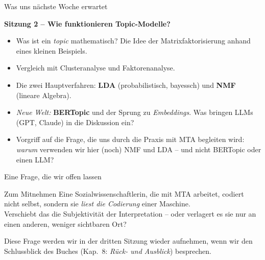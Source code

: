 \documentclass[aspectratio=169,11pt]{beamer}
\let\oldemph\emph
\renewcommand{\emph}[1]{{\color{solCyan}\oldemph{#1}}}
\let\oldtextbf\textbf
\renewcommand{\textbf}[1]{{\color{solBase3}\oldtextbf{#1}}}
\begin{document}
\begin{frame}{Was uns nächste Woche erwartet}

  \textbf{Sitzung 2 – Wie funktionieren Topic-Modelle?}

  \vfill
  \begin{itemize}
    \item Was ist ein \emph{topic} mathematisch? Die Idee der
          Matrixfaktorisierung anhand eines kleinen Beispiels.
    \vfill
    \item Vergleich mit Clusteranalyse und Faktorenanalyse.
    \vfill
    \item Die zwei Hauptverfahren: \textbf{LDA} (probabilistisch,
          bayessch) und \textbf{NMF} (lineare Algebra).
    \vfill
    \item \emph{Neue Welt:} \textbf{BERTopic} und der Sprung zu
          \emph{Embeddings}. Was bringen LLMs (GPT, Claude) in die
          Diskussion ein?
    \vfill
    \item Vorgriff auf die Frage, die uns durch die Praxis mit MTA
          begleiten wird: \emph{warum} verwenden wir hier (noch)
          NMF und LDA – und nicht BERTopic oder einen LLM?
  \end{itemize}

\end{frame}

\begin{frame}{Eine Frage, die wir offen lassen}

  \begin{block}{Zum Mitnehmen}
    Eine Sozialwissenschaftlerin, die mit MTA arbeitet, codiert nicht
    selbst, sondern sie \emph{liest die Codierung} einer Maschine.
    \\[4pt]
    Verschiebt das die Subjektivität der Interpretation
    – oder verlagert es sie nur an einen anderen, weniger sichtbaren
    Ort?
  \end{block}

  \vfill
  Diese Frage werden wir in der dritten Sitzung wieder aufnehmen,
  wenn wir den Schlussblick des Buches (Kap.~8: \emph{Rück- und
  Ausblick}) besprechen.

\end{frame}
\end{document}
